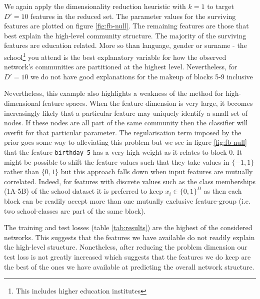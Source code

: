 We again apply the dimensionality reduction heuristic with $k=1$ to target $D'=10$ features in the reduced set. The parameter values for the surviving features are plotted on figure \ref{fig:fb-null}. The remaining features are those that best explain the high-level community structure. The majority of the surviving features are education related. More so than language, gender or surname - the school\footnote{This includes higher education institutes} you attend is the best explanatory variable for how the observed network's communities are partitioned at the highest level. Nevertheless, for $D'=10$ we do not have good explanations for the makeup of blocks 5-9 inclusive

Nevertheless, this example also highlights a weakness of the method for high-dimensional feature spaces. When the feature dimension is very large, it becomes increasingly likely that a particular feature may uniquely identify a small set of nodes. If these nodes are all part of the same community then the classifier will overfit for that particular parameter. The regularisation term imposed by the prior goes some way to alleviating this problem but we see in figure \ref{fig:fb-null} that the feature \verb*|birthday-5| has a very high weight as it relates to block 0. It might be possible to shift the feature values such that they take values in $\{-1, 1\}$ rather than $\{0, 1\}$ but this approach falls down when input features are mutually correlated. Indeed, for features with discrete values such as the class memberships (1A-5B) of the school dataset it is preferred to keep $x_i \in \{0, 1\}^D$ as then each block can be readily accept more than one mutually exclusive feature-group (i.e. two school-classes are part of the same block).

The training and test losses (table \ref{tab:results}) are the highest of the considered networks. This suggests that the features we have available do not readily explain the high-level structure. Nonetheless, after reducing the problem dimension our test loss is not greatly increased which suggests that the features we do keep are the best of the ones we have available at predicting the overall network structure. 


